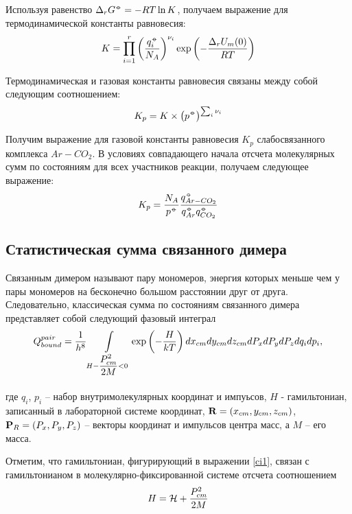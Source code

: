 Используя равенство $\Delta_r G^{\barcirc} = - RT \ln K$, получаем выражение для термодинамической константы равновесия:
\vverh
\begin{gather}
	K = \prod_{i = 1}^{r} \lb \frac{q_i^{\barcirc}}{N_A} \rb^{\nu_i} \exp \lb - \frac{\Delta_r U_m (0)}{RT} \rb \notag
\end{gather}

Термодинамическая и газовая константы равновесия связаны между собой следующим соотношением: 
\vverh
\begin{gather}
	K_p =  K \times \lb p^{\barcirc} \rb^{\sum_i \nu_i} \notag 
\end{gather}

Получим выражение для газовой константы равновесия $K_p$ слабосвязанного комплекса $Ar-CO_2$. В условиях совпадающего начала отсчета молекулярных сумм по состояниям для всех участников реакции, получаем следующее выражение:
\vverh
\begin{gather}
	K_p = \frac{N_A}{p^{\barcirc}} \frac{q_{Ar-CO_2}^{\barcirc}}{q_{Ar}^{\barcirc} q_{CO_2}^{\barcirc}} \label{eqconst}
\end{gather}

\subsection{Статистическая сумма связанного димера} 

Связанным димером называют пару мономеров, энергия которых меньше чем у пары мономеров на бесконечно большом расстоянии друг от друга. Следовательно, классическая сумма по состояниям связанного димера представляет собой следующий фазовый интеграл
\vverh
\begin{gather}
	Q_{bound}^{pair} = \frac{1}{h^8} \int\limits_{H - \frac{\displaystyle \strut P_{cm}^2}{\displaystyle \strut 2 M} < 0} \exp \left( - \frac{H}{k T} \right) d x_{cm} d y_{cm} d z_{cm} d P_{x} d P_{y} d P_{z} d q_i d p_i, \label{ci1}
\end{gather}

где $q_i$, $p_i$ -- набор внутримолекулярных координат и импуьсов, $H$ - гамильтониан, записанный в лабораторной системе координат, $\mathbf{R} = \left( x_{cm}, y_{cm}, z_{cm} \right)$, $\mathbf{P}_R = \left( P_x, P_y, P_z \right)$ -- векторы координат и импульсов центра масс, а $M$ -- его масса. \par
Отметим, что гамильтониан, фигурирующий в выражении \eqref{ci1}, связан с гамильтонианом в молекулярно-фиксированной системе отсчета соотношением
\vverh
\begin{gather}
	H = \mathcal{H} + \frac{P_{cm}^2}{2 M} \notag
\end{gather}

